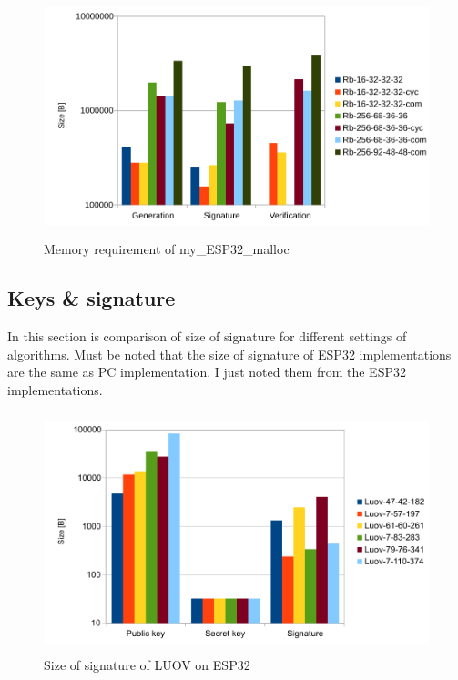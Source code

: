 \documentclass[thesis=M,english]{FITthesis}[2019/12/23]
\begin{document}
\begin{figure}[H]
\centering
\includegraphics[width=13cm,height=7cm]{images/mem-my_esp_malloc.pdf}
\caption{Memory requirement of my\_ESP32\_malloc}
\label{mem-both}
\end{figure}

\subsection{Keys \& signature} \label{key_sign}
In this section is comparison of size of signature for different settings of algorithms. Must be noted that the size of signature of ESP32 implementations are the same as PC implementation. I just noted them from the ESP32 implementations.
\begin{figure}[H]
\centering
\includegraphics[width=13cm,height=7cm]{images/sign-luov.pdf}
\caption{Size of signature of LUOV on ESP32}
\label{sign-luov}
\end{figure}
\end{document}
